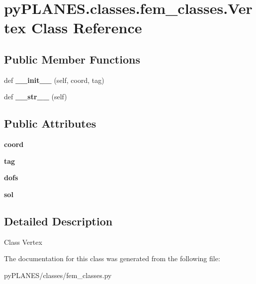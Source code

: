 \hypertarget{classpy_p_l_a_n_e_s_1_1classes_1_1fem__classes_1_1_vertex}{}\section{py\+P\+L\+A\+N\+E\+S.\+classes.\+fem\+\_\+classes.\+Vertex Class Reference}
\label{classpy_p_l_a_n_e_s_1_1classes_1_1fem__classes_1_1_vertex}
\subsection*{Public Member Functions}
\begin{DoxyCompactItemize}
\item 
\mbox{\label{classpy_p_l_a_n_e_s_1_1classes_1_1fem__classes_1_1_vertex_ab3a5735bafaa07a1d4169ff36c1ca877}} 
def {\bfseries \+\_\+\+\_\+init\+\_\+\+\_\+} (self, coord, tag)
\item 
\mbox{\label{classpy_p_l_a_n_e_s_1_1classes_1_1fem__classes_1_1_vertex_a55ca9ffcaa29bd1b4fb604153719d91e}} 
def {\bfseries \+\_\+\+\_\+str\+\_\+\+\_\+} (self)
\end{DoxyCompactItemize}
\subsection*{Public Attributes}
\begin{DoxyCompactItemize}
\item 
\mbox{\label{classpy_p_l_a_n_e_s_1_1classes_1_1fem__classes_1_1_vertex_a96e1a6d9158707e4af8fadfa8f406b0c}} 
{\bfseries coord}
\item 
\mbox{\label{classpy_p_l_a_n_e_s_1_1classes_1_1fem__classes_1_1_vertex_ac884dc4c536579a42d8e19b205ad37fc}} 
{\bfseries tag}
\item 
\mbox{\label{classpy_p_l_a_n_e_s_1_1classes_1_1fem__classes_1_1_vertex_ab319ac1b63555508cffc14223dfbc605}} 
{\bfseries dofs}
\item 
\mbox{\label{classpy_p_l_a_n_e_s_1_1classes_1_1fem__classes_1_1_vertex_a071c9de849cb1a500b6a5247f4ba406f}} 
{\bfseries sol}
\end{DoxyCompactItemize}


\subsection{Detailed Description}
\begin{DoxyVerb}Class Vertex\end{DoxyVerb}
 

The documentation for this class was generated from the following file\+:\begin{DoxyCompactItemize}
\item 
py\+P\+L\+A\+N\+E\+S/classes/fem\+\_\+classes.\+py\end{DoxyCompactItemize}
